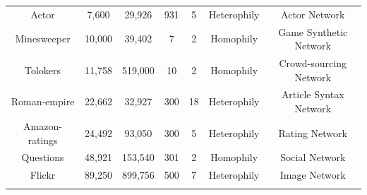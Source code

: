 \begin{table}[t]
{\begin{tabular}{ccccccc}
    Actor & 7,600 & 29,926 & 931 & 5 & Heterophily  &  Actor Network \\
    Minesweeper & 10,000 & 39,402 & 7 & 2 & Homophily &  Game Synthetic Network\\
    Tolokers & 11,758 & 519,000 & 10 & 2 & Homophily &  Crowd-sourcing Network\\
    Roman-empire & 22,662 & 32,927 & 300 & 18 & Heterophily  &  Article Syntax Network\\
    Amazon-ratings & 24,492 & 93,050 & 300 & 5 & Heterophily  &  Rating Network\\
    Questions & 48,921 & 153,540 & 301 & 2 & Homophily &  Social Network\\
    Flickr & 89,250 & 899,756 & 500 & 7 & Heterophily & Image Network\\ 
        \arrayrulecolor{myblue5}\bottomrule[0.16em]%
\end{tabular}}
\end{table}



